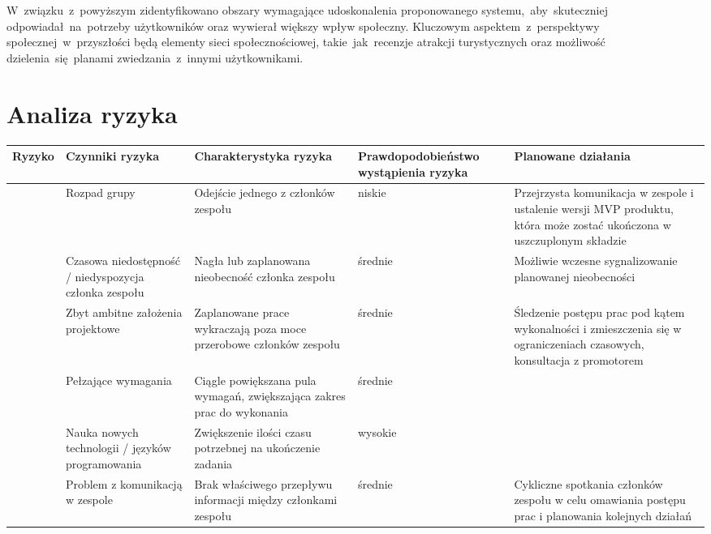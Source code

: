 \indent W~związku~z~powyższym zidentyfikowano obszary wymagające udoskonalenia proponowanego systemu,~aby~skuteczniej odpowiadał~na~potrzeby użytkowników oraz wywierał większy wpływ społeczny.
Kluczowym aspektem~z~perspektywy społecznej~w~przyszłości będą elementy sieci społecznościowej, takie~jak~recenzje atrakcji turystycznych oraz możliwość dzielenia~się~planami zwiedzania~z~innymi użytkownikami.



\pagebreak
\section{Analiza ryzyka}
\label{sec:analiza-ryzyka}

\begin{longtable}{|p{.1\linewidth}|p{}|p{}|p{}|p{}|}
    \hline
    Ryzyko & Czynniki ryzyka & Charakterystyka ryzyka & Prawdopodobieństwo wystąpienia ryzyka & Planowane działania \\
    \hline
    \multirow{6}{=}{\parbox[c]{12cm}{}}& Rozpad grupy & Odejście jednego z członków zespołu & niskie
    & Przejrzysta komunikacja w zespole i ustalenie wersji MVP produktu, która może zostać ukończona w uszczuplonym składzie \\
    \cline{2-5}
    & Czasowa niedostępność / niedyspozycja członka zespołu & Nagła lub zaplanowana nieobecność członka zespołu & średnie
    & Możliwie wczesne sygnalizowanie planowanej nieobecności \\
    \cline{2-5}
    & Zbyt ambitne założenia projektowe & Zaplanowane prace wykraczają poza moce przerobowe członków zespołu & średnie
    & Śledzenie postępu prac pod kątem wykonalności i zmieszczenia się w ograniczeniach czasowych, konsultacja z promotorem \\
    \cline{2-5}
    & Pełzające wymagania & Ciągle powiększana pula wymagań, zwiększająca zakres prac do wykonania & średnie & \\
    \cline{2-5}
    & Nauka nowych technologii / języków programowania & Zwiększenie ilości czasu potrzebnej na ukończenie zadania &
    wysokie & \\
    \cline{2-5}
    & Problem z komunikacją w zespole & Brak właściwego przepływu informacji między członkami zespołu & średnie
    & Cykliczne spotkania członków zespołu w celu omawiania postępu prac i planowania kolejnych działań \\

\end{longtable}
